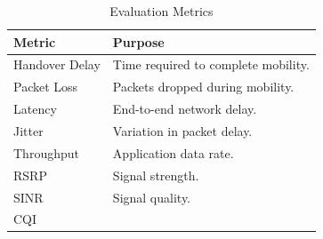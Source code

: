 \documentclass[12pt,a4paper]{article}\usepackage[a4paper,margin=1in]{geometry}\usepackage{graphicx}\usepackage{longtable}\usepackage{booktabs}\usepackage{hyperref}\usepackage{enumitem}\usepackage{amsmath}\usepackage{tikz}\usepackage{pgfgantt}\usepackage{setspace}\setstretch{1.15}\usetikzlibrary{positioning,arrows.meta,shapes.geometric}
\begin{document}
	\begin{table}[h]
		
		\centering
		
		\caption{Evaluation Metrics}
		
		\begin{tabular}{p{5cm}p{8cm}}
			
			\toprule
			
			Metric
			
			&
			
			Purpose
			
			\\
			
			\midrule
			
			Handover Delay
			
			&
			
			Time required to complete mobility.
			
			\\
			
			Packet Loss
			
			&
			
			Packets dropped during mobility.
			
			\\
			
			Latency
			
			&
			
			End-to-end network delay.
			
			\\
			
			Jitter
			
			&
			
			Variation in packet delay.
			
			\\
			
			Throughput
			
			&
			
			Application data rate.
			
			\\
			
			RSRP
			
			&
			
			Signal strength.
			
			\\
			
			SINR
			
			&
			
			Signal quality.
			
			\\
			
			CQI
			

\end{tabular}
\end{table}
\end{document}

